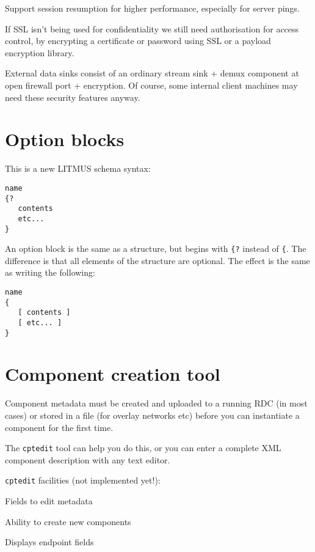\documentclass[12pt,a4paper,twoside]{article}
\renewcommand{\_}{\texttt{\symbol{95}}}
\begin{document}
Support session resumption for higher performance, especially for
server pings.

If SSL isn't being used for confidentiality we still need
authorisation for access control, by encrypting a certificate or
password using SSL or a payload encryption library.

External data sinks consist of an ordinary stream sink + demux
component at open firewall port + encryption. Of course, some internal
client machines may need these security features anyway.

\section{Option blocks}

This is a new LITMUS schema syntax:

\begin{verbatim}
name
{?
   contents
   etc...
}
\end{verbatim}

An option block is the same as a structure, but begins with
\verb^{?^ instead of \verb^{^. The difference is that all
elements of the structure are optional. The effect is the
same as writing the following:

\begin{verbatim}
name
{
   [ contents ]
   [ etc... ]
}
\end{verbatim}

\section{Component creation tool}

Component metadata must be created and uploaded to a running RDC (in most
cases) or stored in a file (for overlay networks etc) before you can
instantiate a component for the first time.

The \texttt{cptedit} tool can help you do this, or you can enter a complete
XML component description with any text editor.

\texttt{cptedit} facilities (not implemented yet!):
\begin{bulletlist}
\item Fields to edit metadata
\item Ability to create new components
\item Displays endpoint fields
\end{bulletlist}
\end{document}
